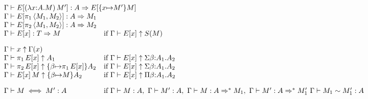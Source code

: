 \documentclass[]{article}
\begin{document}
\newcommand{\weakconequiv}[4]{#1\vdash #2 \sim #3 : #4}
\newcommand{\conequiv}[4]{#1\vdash #2 \iff #3 : #4}
\newcommand{\headnormto}[4]{#1\vdash #2 : #3 \Rightarrow #4}
\newcommand{\headnormsto}[4]{#1\vdash #2 : #3 \Rightarrow^{*} #4}
\newcommand{\reconstruct}[3]{#1\vdash #2 \uparrow #3}
\[
\!\!\!\!\!\!\!\begin{array}{ll}
\headnormto{\context}
   {E[\capply{(\cfunction{\cvar}{\kind}{\constructor})}
             {\constructor'}]}
   {\kind}
   {E[\substitute{\cvar}{\constructor'}{\constructor}]}\hidewidth\\
\headnormto{\context}
   {E[\cpi{1}{\cpair{\constructor_1}{\constructor_2}}]}
   {\kind}
   {\constructor_1}\\
\headnormto{\context}
   {E[\cpi{2}{\cpair{\constructor_1}{\constructor_2}}]}
   {\kind}
   {\constructor_2}\\
\headnormto{\context}{E[\cvar]}{\ktype}{\constructor}&
   \mbox{if}\ 
   \reconstruct{\context}{E[\cvar]}{\ksingleton{\constructor}}\\[10pt]

\reconstruct{\context}{\cvar}{\context(\cvar)}\\
\reconstruct{\context}{\cpi{1}{E[\cvar]}}{\kind_1}&
  \mbox{if}\
  \reconstruct{\context}{E[\cvar]}{\ksigma{\beta}{\kind_1}{\kind_2}}\\
\reconstruct{\context}{\cpi{2}{E[\cvar]}}
  {\substitute{\beta}{\cpi{1}{E[\cvar]}}\kind_2}&
  \mbox{if}\
  \reconstruct{\context}{E[\cvar]}{\ksigma{\beta}{\kind_1}{\kind_2}}\\
\reconstruct{\context}{\capply{E[\cvar]}{\constructor}}
  {\substitute{\beta}{\constructor}{\kind_2}}&
  \mbox{if}\ 
  \reconstruct{\context}{E[\cvar]}{\kpi{\beta}{\kind_1}{\kind_2}}\\[10pt]

\conequiv{\context}{\constructor}{\constructor'}{\kind}&
  \mbox{if}\ 
    \validconstructor{\context}{\constructor}{\kind},\
    \validconstructor{\context}{\constructor'}{\kind},\
    \headnormsto{\context}{\constructor}{\kind}{\constructor_1},\
    \headnormsto{\context}{\constructor'}{\kind}{\constructor'_1}\
    \weakconequiv{\context}{\constructor_1}{\constructor'_1}{\kind}\\[10pt]


\end{array}\]
\end{document}
